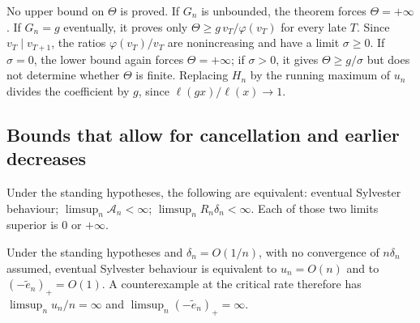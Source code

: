 No upper bound on $\Theta$ is proved. If $G_n$ is unbounded, the theorem
forces $\Theta=+\infty$. If $G_n=g$ eventually, it proves only
$\Theta\ge g\,v_T/\varphi(v_T)$ for every late $T$. Since $v_T\mid v_{T+1}$,
the ratios $\varphi(v_T)/v_T$ are nonincreasing and have a limit
$\sigma\ge0$. If $\sigma=0$, the lower bound again forces
$\Theta=+\infty$; if $\sigma>0$, it gives $\Theta\ge g/\sigma$ but does
not determine whether $\Theta$ is finite. Replacing $H_n$ by the running
maximum of $u_n$ divides the coefficient by $g$, since
$\ell(gx)/\ell(x)\to1$.

\subsection{Bounds that allow for cancellation and earlier decreases}

\begin{theorem}\label{long243:res:recordamplified}
Under the standing hypotheses, the following are equivalent: eventual Sylvester behaviour; $\limsup_n\mathcal A_n<\infty$;
$\limsup_nR_n\delta_n<\infty$.  Each of those two limits superior is $0$ or
$+\infty$.
\end{theorem}

\begin{corollary}\label{long243:res:criticalrate}
Under the standing hypotheses and $\delta_n=O(1/n)$, with no convergence of $n\delta_n$ assumed,
eventual Sylvester behaviour is equivalent to $u_n=O(n)$ and to $(-\tilde e_n)_+=O(1)$.  A
counterexample at the critical rate therefore has $\limsup_nu_n/n=\infty$ and
$\limsup_n(-\tilde e_n)_+=\infty$.
\end{corollary}

